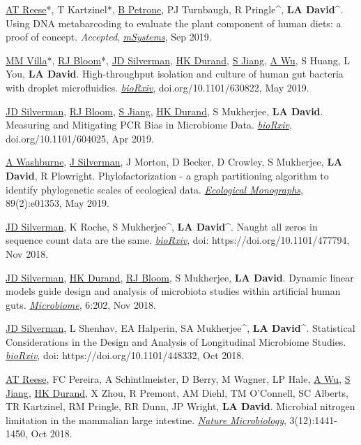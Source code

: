 \documentclass[overlapped,line,11pt]{res}
\begin{document}
\begin{resume}
\begin{revnumerate}[29]

\item{\ul{AT Reese}*, T Kartzinel*, \ul{B Petrone}, PJ Turnbaugh, R
  Pringle\^{}, \textbf{LA David}\^{}. Using DNA metabarcoding to
  evaluate the plant component of human diets: a proof of
  concept. \emph{Accepted}, \emph{\ul{mSystems}}, Sep 2019.}

\item{\ul{MM Villa}*, \ul{RJ Bloom}*, \ul{JD Silverman},
  \ul{HK Durand}, \ul{S Jiang}, \ul{A Wu}, S Huang, L You, \textbf{LA
    David}. High-throughput isolation and culture of human gut
  bacteria with droplet microfluidics. \emph{\ul{bioRxiv}},
  doi.org/10.1101/630822, May 2019.}

\item{\ul{JD Silverman}, \ul{RJ Bloom}, \ul{S Jiang}, \ul{HK Durand},
  S Mukherjee, \textbf{LA David}. Measuring and Mitigating PCR Bias in
  Microbiome Data. \emph{\ul{bioRxiv}}, doi.org/10.1101/604025, Apr 2019.}

\item{\ul{A Washburne}, \ul{J Silverman}, J Morton, D Becker, D
  Crowley, S Mukherjee, \textbf{LA David}, R Plowright. Phylofactorization - a
  graph partitioning algorithm to identify phylogenetic scales of
  ecological data. \emph{\ul{Ecological Monographs}}, 89(2):e01353, May 2019.}

\item{\ul{JD Silverman}, K Roche, S Mukherjee\^{}, \textbf{LA
      David}\^{}. Naught all zeros in sequence count data are the
    same. \emph{\ul{bioRxiv}}}, doi: https://doi.org/10.1101/477794, Nov 2018.

  \item {\ul{JD Silverman}, \ul{HK Durand}, \ul{RJ Bloom}, S
    Mukherjee, \textbf{LA David}. Dynamic linear models guide design
    and analysis of microbiota studies within artificial human
    guts. \emph{\ul{Microbiome}}, 6:202, Nov 2018.}

\item{\ul{JD Silverman}, L Shenhav, EA Halperin, SA Mukherjee\^{},
  \textbf{LA David}\^{}. Statistical Considerations in the Design
  and Analysis of Longitudinal Microbiome
  Studies. \emph{\ul{bioRxiv}}}, doi: https://doi.org/10.1101/448332,
  Oct 2018.

  \item {\ul{AT Reese}, FC Pereira, A Schintlmeister, D Berry, M
    Wagner, LP Hale, \ul{A Wu}, \ul{S Jiang}, \ul{HK Durand}, X Zhou,
    R Premont, AM Diehl, TM O’Connell, SC Alberts, TR Kartzinel, RM
    Pringle, RR Dunn, JP Wright, \textbf{LA David}. Microbial nitrogen
    limitation in the mammalian large intestine. \emph{\ul{Nature
        Microbiology}}, 3(12):1441-1450, Oct 2018.}


\end{revnumerate}
\end{resume}
\end{document}
